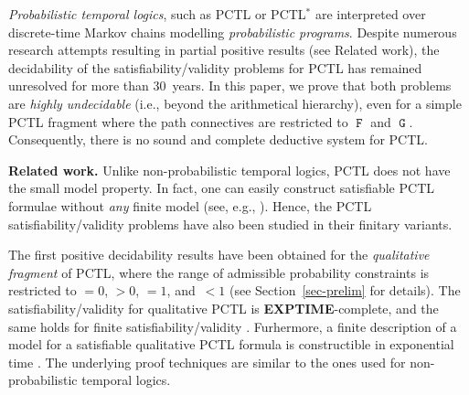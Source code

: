 \documentclass[a4paper,UKenglish,cleveref, autoref, thm-restate]{lipics-v2021}
\newcommand{\EXPTIME}{\textbf{EXPTIME}}
\newcommand*{\opf}{\operatorname{\pmb{\mathtt{F}}}}
\newcommand*{\opg}{\operatorname{\pmb{\mathtt{G}}}}
\begin{document}
\emph{Probabilistic temporal logics}, such as PCTL or PCTL$^*$ \cite{HJ:logic-time-probability-FAC} are interpreted over discrete-time Markov chains 
modelling \emph{probabilistic programs}. 
Despite numerous research attempts resulting in partial positive results  (see Related work), the decidability of the satisfiability/validity problems for PCTL has remained unresolved for more than 30~years. In this paper, we prove that both problems are \emph{highly undecidable} (i.e., beyond the arithmetical hierarchy), even for a simple PCTL fragment where the path connectives are restricted to $\opf$ and $\opg$. Consequently, there is no sound and complete deductive system for PCTL.
\smallskip

\noindent
\textbf{Related work.}
Unlike non-probabilistic temporal logics, PCTL does not have the small model property. In fact, one can easily construct satisfiable PCTL formulae without \emph{any} finite model (see, e.g., \cite{BFKK:satisfiability}). Hence, the PCTL satisfiability/validity problems have also been studied in their finitary variants.

The first positive decidability results have been obtained for the \emph{qualitative fragment} of PCTL, where the range of admissible probability constraints is restricted to ${=}0$, ${>}0$, ${=}1$, and~${<}1$ (see Section~\ref{sec-prelim} for details). The satisfiability/validity for qualitative PCTL is \EXPTIME-complete, and the same holds for finite satisfiability/validity  \cite{LS:time-chance-IC,HS:Prob-temp-logic,KL:qPCTL-satisfiability}. Furhermore, a finite description of a model for a satisfiable qualitative PCTL formula is constructible in exponential time \cite{BFKK:satisfiability}. The underlying proof techniques are similar to the ones used for non-probabilistic temporal logics.
\end{document}
